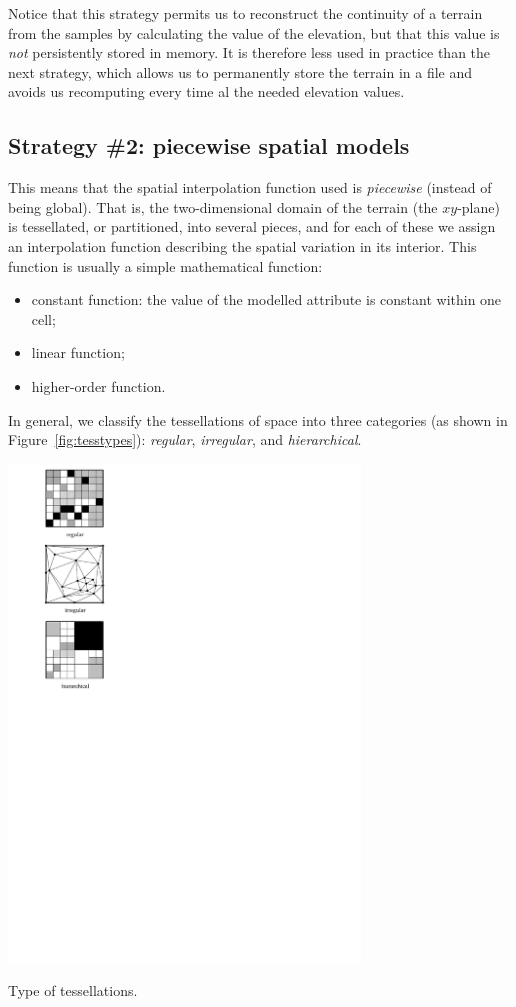 Notice that this strategy permits us to reconstruct the continuity of a terrain from the samples by calculating the value of the elevation, but that this value is \emph{not} persistently stored in memory.
It is therefore less used in practice than the next strategy, which allows us to permanently store the terrain in a file and avoids us recomputing every time al the needed elevation values.


\subsection{Strategy \#2: piecewise spatial models}
This means that the spatial interpolation function used is \emph{piecewise} (instead of being global).
That is, the two-dimensional domain of the terrain (the $xy$-plane) is tessellated, or partitioned, into several pieces, and for each of these we assign an interpolation function describing the spatial variation in its interior.
This function is usually a simple mathematical function:
\begin{itemize}
  \item constant function: the value of the modelled attribute is constant within one cell;
  \item linear function;
  \item higher-order function.
\end{itemize}

%

In general, we  classify the tessellations of space into three categories (as shown in Figure~\ref{fig:tesstypes}): \emph{regular}, \emph{irregular}, and \emph{hierarchical}.%
\begin{marginfigure}
  \centering
  \includegraphics[width=0.7\textwidth]{figs/tesstype}
  \caption{Type of tessellations.}%
\label{fig:tesstypes}
\end{marginfigure}

